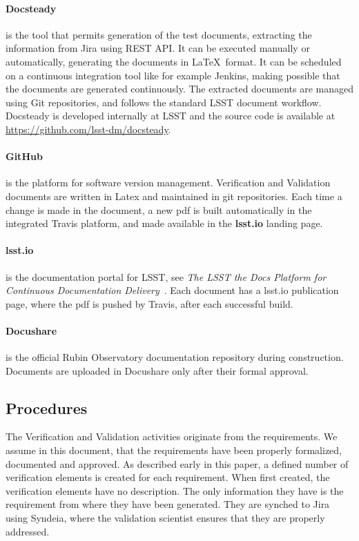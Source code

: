 \paragraph{Docsteady}
is the tool that permits generation of the test documents, extracting the information from Jira using REST API.
It can be executed manually or automatically, generating the documents in \LaTeX~format.
It can be scheduled on a continuous integration tool like for example Jenkins, making possible that 
the documents are generated continuously.
The extracted documents are managed using Git repositories, and follows the  standard LSST document workflow.
Docsteady is developed internally at LSST and the source code is available at \url{https://github.com/lsst-dm/docsteady}.

\paragraph{GitHub}
is the platform for software version management.
Verification and Validation documents are written in Latex and maintained in git repositories.
Each time a change is made in the document, a new pdf is built automatically in the integrated Travis platform, and made available in the \textbf{lsst.io} landing page.

\paragraph{lsst.io}
is the documentation portal for LSST, see \textit{The LSST the Docs Platform for Continuous Documentation Delivery}\cite{SQR-006}~.
Each document has a lsst.io publication page, where the pdf is pushed by Travis, after each successful build.

\paragraph{Docushare}
is the official Rubin Observatory documentation repository during construction.
Documents are uploaded in Docushare only after their formal approval.


\subsection{Procedures}

The Verification and Validation activities originate from the requirements.
We assume in this document, that the requirements have been properly formalized, documented and approved.
As described early in this paper, a defined number of verification elements is created for each requirement.
When first created, the verification elements have no description. The only information they have is the requirement from where they have been generated.
They are synched to Jira using Syndeia, where the validation scientist ensures that they are properly addressed.

